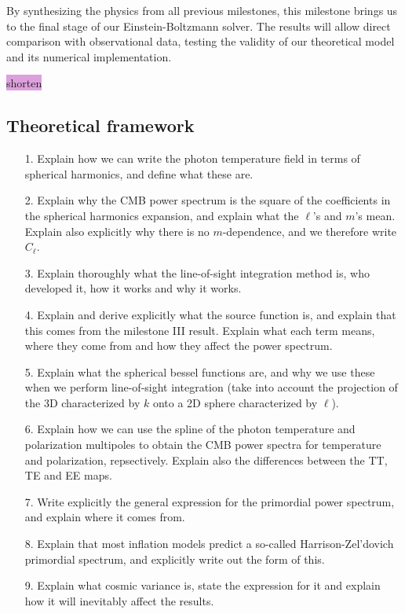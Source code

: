 \documentclass{aa}
\begin{document}
By synthesizing the physics from all previous milestones, this milestone brings us to the final stage of our Einstein-Boltzmann solver. The results will allow direct comparison with observational data, testing the validity of our theoretical model and its numerical implementation.

\colorbox{Plum}{shorten}




\subsection{Theoretical framework}\label{subsec: IV theory}
\begin{enumerate}
  \item [1.] Explain how we can write the photon temperature field in terms of spherical harmonics, and define what these are.
  \item [2.] Explain why the CMB power spectrum is the square of the coefficients in the spherical harmonics expansion, and explain what the $\ell$'s and $m$'s mean. Explain also explicitly why there is no $m$-dependence, and we therefore write $C_\ell$.
  \item [3.] Explain thoroughly what the line-of-sight integration method is, who developed it, how it works and why it works.
  \item [4.] Explain and derive explicitly what the source function is, and explain that this comes from the milestone III result. Explain what each term means, where they come from and how they affect the power spectrum.
  \item [5.] Explain what the spherical bessel functions are, and why we use these when we perform line-of-sight integration (take into account the projection of the 3D characterized by $k$ onto a 2D sphere characterized by $\ell$).
  \item [6.] Explain how we can use the spline of the photon temperature and polarization multipoles to obtain the CMB power spectra for temperature and polarization, repsectively. Explain also the differences between the TT, TE and EE maps.
  \item [7.] Write explicitly the general expression for the primordial power spectrum, and explain where it comes from.
  \item [8.] Explain that most inflation models predict a so-called Harrison-Zel'dovich primordial spectrum, and explicitly write out the form of this. 
  \item [9.] Explain what cosmic variance is, state the expression for it and explain how it will inevitably affect the results.

\end{enumerate}
\end{document}
